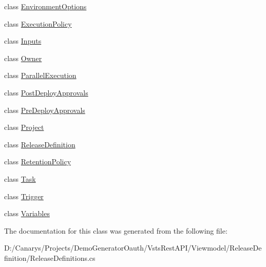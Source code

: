\begin{DoxyCompactItemize}
\item 
class \mbox{\hyperlink{class_vsts_rest_a_p_i_1_1_viewmodel_1_1_release_definition_1_1_release_definitions_1_1_environment_options}{Environment\+Options}}
\item 
class \mbox{\hyperlink{class_vsts_rest_a_p_i_1_1_viewmodel_1_1_release_definition_1_1_release_definitions_1_1_execution_policy}{Execution\+Policy}}
\item 
class \mbox{\hyperlink{class_vsts_rest_a_p_i_1_1_viewmodel_1_1_release_definition_1_1_release_definitions_1_1_inputs}{Inputs}}
\item 
class \mbox{\hyperlink{class_vsts_rest_a_p_i_1_1_viewmodel_1_1_release_definition_1_1_release_definitions_1_1_owner}{Owner}}
\item 
class \mbox{\hyperlink{class_vsts_rest_a_p_i_1_1_viewmodel_1_1_release_definition_1_1_release_definitions_1_1_parallel_execution}{Parallel\+Execution}}
\item 
class \mbox{\hyperlink{class_vsts_rest_a_p_i_1_1_viewmodel_1_1_release_definition_1_1_release_definitions_1_1_post_deploy_approvals}{Post\+Deploy\+Approvals}}
\item 
class \mbox{\hyperlink{class_vsts_rest_a_p_i_1_1_viewmodel_1_1_release_definition_1_1_release_definitions_1_1_pre_deploy_approvals}{Pre\+Deploy\+Approvals}}
\item 
class \mbox{\hyperlink{class_vsts_rest_a_p_i_1_1_viewmodel_1_1_release_definition_1_1_release_definitions_1_1_project}{Project}}
\item 
class \mbox{\hyperlink{class_vsts_rest_a_p_i_1_1_viewmodel_1_1_release_definition_1_1_release_definitions_1_1_release_definition}{Release\+Definition}}
\item 
class \mbox{\hyperlink{class_vsts_rest_a_p_i_1_1_viewmodel_1_1_release_definition_1_1_release_definitions_1_1_retention_policy}{Retention\+Policy}}
\item 
class \mbox{\hyperlink{class_vsts_rest_a_p_i_1_1_viewmodel_1_1_release_definition_1_1_release_definitions_1_1_task}{Task}}
\item 
class \mbox{\hyperlink{class_vsts_rest_a_p_i_1_1_viewmodel_1_1_release_definition_1_1_release_definitions_1_1_trigger}{Trigger}}
\item 
class \mbox{\hyperlink{class_vsts_rest_a_p_i_1_1_viewmodel_1_1_release_definition_1_1_release_definitions_1_1_variables}{Variables}}
\end{DoxyCompactItemize}


The documentation for this class was generated from the following file\+:\begin{DoxyCompactItemize}
\item 
D\+:/\+Canarys/\+Projects/\+Demo\+Generator\+Oauth/\+Vsts\+Rest\+A\+P\+I/\+Viewmodel/\+Release\+Definition/Release\+Definitions.\+cs\end{DoxyCompactItemize}
